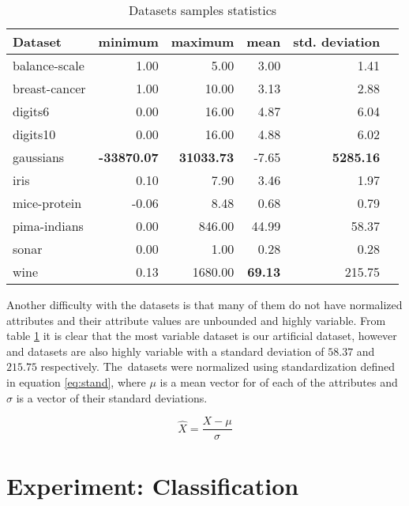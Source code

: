\documentclass[12pt,a4paper]{report}
\begin{document}
\begin{table}[ht] \centering
\begin{tabular}{lrrrrr}
\hline
Dataset & minimum & maximum & mean & std. deviation \\
\hline
balance-scale           & 1.00  & 5.00    & 3.00  & 1.41 \\
breast-cancer           & 1.00  & 10.00   & 3.13  & 2.88 \\
digits6                 & 0.00  & 16.00   & 4.87  & 6.04 \\
digits10                & 0.00  & 16.00   & 4.88  & 6.02 \\
gaussians               & \textbf{-33870.07} & \textbf{31033.73} & -7.65 & \textbf{5285.16} \\
iris                    & 0.10  & 7.90    & 3.46  & 1.97 \\
mice-protein            & -0.06 & 8.48    & 0.68  & 0.79 \\
pima-indians            & 0.00  & 846.00  & 44.99 & 58.37 \\
sonar                   & 0.00  & 1.00    & 0.28  & 0.28 \\
wine                    & 0.13  & 1680.00 & \textbf{69.13} & 215.75 \\
\hline
\end{tabular}
\caption{Datasets samples statistics} \label{tab:datasets-samples}
\end{table}

Another difficulty with the datasets is that many of them do not have normalized attributes and their attribute values are unbounded and highly variable. From table \ref{tab:datasets-samples} it is clear that the most variable dataset is our artificial  dataset, however  and  datasets are also highly variable with a standard deviation of $58.37$ and $215.75$ respectively. The~datasets were normalized using standardization defined in equation \ref{eq:stand}, where $\mu$ is a mean vector for of each of the attributes and $\sigma$ is a vector of their standard deviations.

\begin{equation} \label{eq:stand}
\hat{X} = \frac{X-\mu}{\sigma}
\end{equation}

\section{Experiment: Classification} \label{chap:exp:classification}
\end{document}
